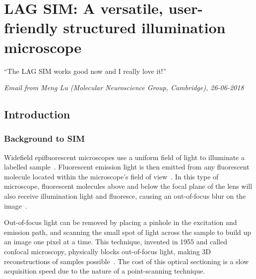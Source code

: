 \chapter{LAG SIM: A versatile, user-friendly structured illumination microscope} \label{chap:LAGSIM}



\ifpdf
    \graphicspath{{Chapter2/Figs/Raster/}{Chapter2/Figs/PDF/}{Chapter2/Figs/}}
\else
    \graphicspath{{Chapter2/Figs/Vector/}{Chapter2/Figs/}}
\fi

``The LAG SIM works good now and I really love it!''

\textit{Email from Meng Lu (Molecular Neuroscience Group, Cambridge), 26-06-2018}

\section{Introduction} \label{sec:simintro}
\subsection{Background to SIM}
Widefield epifluorescent microscopes use a uniform field of light to illuminate a labelled sample~\cite[\textit{ch. 2}]{lakowicz2007principles}. 
Fluorescent emission light is then emitted from any fluorescent molecule located within the microscope's field of view~\cite{pawley2012handbook}. 
In this type of microscope, fluorescent molecules above and below the focal plane of the lens will also receive illumination light and fluoresce, causing an out-of-focus blur on the image~\cite{wilson1984theory}.

Out-of-focus light can be removed by placing a pinhole in the excitation and emission path, and scanning the small spot of light across the sample to build up an image one pixel at a time. 
This technique, invented in 1955 and called confocal microscopy, physically blocks out-of-focus light, making 3D reconstructions of samples possible~\cite{marvin1961microscopy}. 
The cost of this optical sectioning is a slow acquisition speed due to the nature of a point-scanning technique. 

